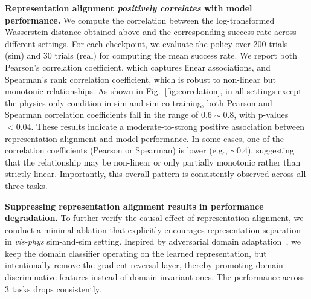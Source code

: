 \textbf{Representation alignment \textit{positively correlates} with model performance.}
We compute the correlation between the log-transformed Wasserstein distance obtained above and the corresponding success rate across different settings.
For each checkpoint, we evaluate the policy over 200 trials (sim) and 30 trials (real) for computing the mean success rate.
We report both Pearson’s correlation coefficient, which captures linear associations, and Spearman’s rank correlation coefficient, which is robust to non-linear but monotonic relationships.
As shown in Fig.~\ref{fig:correlation}, in all settings except the physics-only condition in sim-and-sim co-training, both Pearson and Spearman correlation coefficients fall in the range of $0.6\sim0.8$, with p-values $<0.04$. These results indicate a moderate-to-strong positive association between representation alignment and model performance. In some cases, one of the correlation coefficients (Pearson or Spearman) is lower (e.g., 
$\sim0.4$), suggesting that the relationship may be non-linear or only partially monotonic rather than strictly linear. Importantly, this overall pattern is consistently observed across all three tasks.


\textbf{Suppressing representation alignment results in performance degradation.}
To further verify the causal effect of representation alignment, we conduct a minimal ablation that explicitly encourages representation separation in \textit{vis-phys} sim-and-sim setting.
Inspired by adversarial domain adaptation~\cite{tzeng2017adversarial}, we keep the domain classifier operating on the learned representation, but intentionally remove the gradient reversal layer, thereby promoting domain-discriminative features instead of domain-invariant ones.
The performance across 3 tasks drops consistently.

\begin{table}[hb]
\centering
\vspace{-0.2em}
\caption{\textbf{Performance degrades after adding penalty for representation alignment.} The experiments are run with $w=0.1$.}

\end{table}



